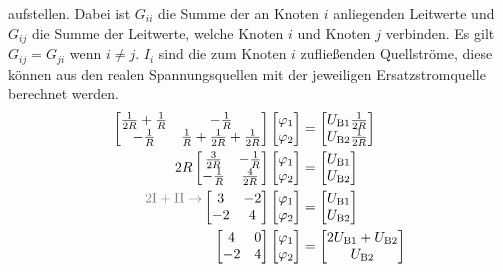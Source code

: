 aufstellen. Dabei ist $G_{ii}$ die Summe der an Knoten $i$ anliegenden Leitwerte und $G_{ij}$ die Summe der Leitwerte, welche Knoten $i$ und Knoten $j$ verbinden. Es gilt $G_{ij} = G_{ji}$ wenn $i\neq j$. $I_i$ sind die zum Knoten $i$ zufließenden Quellströme, diese können aus den realen Spannungsquellen mit der jeweiligen Ersatzstromquelle berechnet werden.
\begin{align*}
    \begin{bmatrix}
        \frac{1}{2R} + \frac{1}{R} & -\frac{1}{R} \\
        -\frac{1}{R} & \frac{1}{R} + \frac{1}{2R} + \frac{1}{2R}
    \end{bmatrix} \begin{bmatrix}
        \varphi_1 \\ \varphi_2 
    \end{bmatrix} &= \begin{bmatrix}
        U_\text{B1} \frac{1}{2R} \\ U_\text{B2} \frac{1}{2R}
    \end{bmatrix} \\
    2R\begin{bmatrix}
        \frac{3}{2R} & -\frac{1}{R} \\
        -\frac{1}{R} & \frac{4}{2R}
    \end{bmatrix} \begin{bmatrix}
        \varphi_1 \\ \varphi_2 
    \end{bmatrix} &= \begin{bmatrix}
        U_\text{B1} \\ U_\text{B2}
    \end{bmatrix} \\
    \begin{matrix}
        \color{gray} 2 \text{I} + \text{II} \to \\ \hspace{1pt}
    \end{matrix}
    \begin{bmatrix}
        3 & -2 \\ -2 & 4
    \end{bmatrix} \begin{bmatrix}
        \varphi_1 \\ \varphi_2 
    \end{bmatrix} &= \begin{bmatrix}
        U_\text{B1} \\ U_\text{B2}
    \end{bmatrix} \\
    \begin{bmatrix}
        4 & 0 \\ -2 & 4
    \end{bmatrix} \begin{bmatrix}
        \varphi_1 \\ \varphi_2 
    \end{bmatrix} &= \begin{bmatrix}
        2U_\text{B1} + U_\text{B2} \\
        U_\text{B2}
    \end{bmatrix}
\end{align*}

